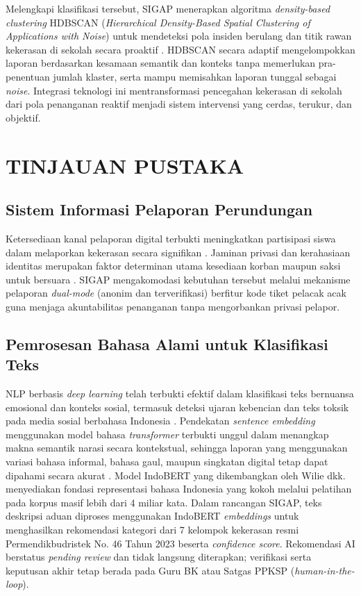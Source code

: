 \documentclass[conference]{IEEEtran}
\begin{document}
Melengkapi klasifikasi tersebut, SIGAP menerapkan algoritma \textit{density-based clustering} HDBSCAN (\textit{Hierarchical Density-Based Spatial Clustering of Applications with Noise}) untuk mendeteksi pola insiden berulang dan titik rawan kekerasan di sekolah secara proaktif \cite{grootendorst2022,malzer2020}. HDBSCAN secara adaptif mengelompokkan laporan berdasarkan kesamaan semantik dan konteks tanpa memerlukan pra-penentuan jumlah klaster, serta mampu memisahkan laporan tunggal sebagai \textit{noise}. Integrasi teknologi ini mentransformasi pencegahan kekerasan di sekolah dari pola penanganan reaktif menjadi sistem intervensi yang cerdas, terukur, dan objektif.

\section{TINJAUAN PUSTAKA}

\subsection{Sistem Informasi Pelaporan Perundungan}
Ketersediaan kanal pelaporan digital terbukti meningkatkan partisipasi siswa dalam melaporkan kekerasan secara signifikan \cite{evangelio2022}. Jaminan privasi dan kerahasiaan identitas merupakan faktor determinan utama kesediaan korban maupun saksi untuk bersuara \cite{kaloeti2021,kasturiratna2025}. SIGAP mengakomodasi kebutuhan tersebut melalui mekanisme pelaporan \textit{dual-mode} (anonim dan terverifikasi) berfitur kode tiket pelacak acak guna menjaga akuntabilitas penanganan tanpa mengorbankan privasi pelapor.

\subsection{Pemrosesan Bahasa Alami untuk Klasifikasi Teks}
NLP berbasis \textit{deep learning} telah terbukti efektif dalam klasifikasi teks bernuansa emosional dan konteks sosial, termasuk deteksi ujaran kebencian dan teks toksik pada media sosial berbahasa Indonesia \cite{nabiilah2024}. Pendekatan \textit{sentence embedding} menggunakan model bahasa \textit{transformer} terbukti unggul dalam menangkap makna semantik narasi secara kontekstual, sehingga laporan yang menggunakan variasi bahasa informal, bahasa gaul, maupun singkatan digital tetap dapat dipahami secara akurat \cite{wongso2023}. Model IndoBERT yang dikembangkan oleh Wilie dkk. \cite{wilie2020} menyediakan fondasi representasi bahasa Indonesia yang kokoh melalui pelatihan pada korpus masif lebih dari 4 miliar kata. Dalam rancangan SIGAP, teks deskripsi aduan diproses menggunakan IndoBERT \textit{embeddings} untuk menghasilkan rekomendasi kategori dari 7 kelompok kekerasan resmi Permendikbudristek No. 46 Tahun 2023 beserta \textit{confidence score}. Rekomendasi AI berstatus \textit{pending review} dan tidak langsung diterapkan; verifikasi serta keputusan akhir tetap berada pada Guru BK atau Satgas PPKSP (\textit{human-in-the-loop}).
\end{document}

